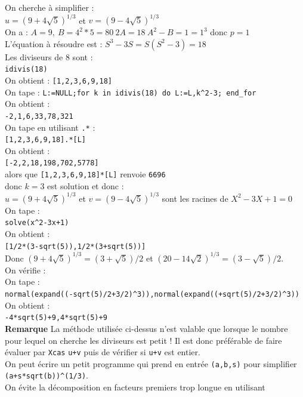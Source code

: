 \documentclass[a4paper,11pt]{book}
\begin{document}
On cherche \`a simplifier :\\
$u=(9+4\sqrt 5)^{1/3}$ et $v=(9-4\sqrt 5)^{1/3}$\\
On a : $A=9,\ B=4^2*5=80 \ 2A=18 \ A^2-B=1=1^3$ donc $p=1$\\
L'\'equation \`a r\'esoudre est : $S^3-3S=S(S^2-3)=18$\\
Les diviseurs de 8 sont :\\
{\tt idivis(18)}\\
On obtient :
{\tt [1,2,3,6,9,18]}\\
On tape :
{\tt L:=NULL;for k in  idivis(18) do L:=L,k\verb|^|2-3; end\_for}\\
On obtient :\\
{\tt -2,1,6,33,78,321}\\
On tape  en utilisant {\tt .*} :\\
{\tt [1,2,3,6,9,18].*[L]}\\
On obtient :\\
{\tt [-2,2,18,198,702,5778]}\\
alors que {\tt [1,2,3,6,9,18]*[L]} renvoie {\tt 6696}\\
donc $k=3$ est solution et donc :\\
$u=(9+4\sqrt 5)^{1/3}$ et $v=(9-4\sqrt 5)^{1/3}$ sont les racines de 
$X^2-3X+1=0$\\
On tape :\\
{\tt solve(x\verb|^|2-3x+1)}\\
On obtient :\\
{\tt [1/2*(3-sqrt(5)),1/2*(3+sqrt(5))]}\\
Donc $(9+4\sqrt 5)^{1/3}=(3+\sqrt 5)/2$ et $(20-14\sqrt 2)^{1/3}=(3-\sqrt 5)/2$.\\
On v\'erifie :\\
On tape :\\
{\tt normal(expand((-sqrt(5)/2+3/2)\verb|^|3)),normal(expand((+sqrt(5)/2+3/2)\verb|^|3))}
On obtient :\\
{\tt -4*sqrt(5)+9,4*sqrt(5)+9}\\
{\bf Remarque} La m\'ethode utilis\'ee ci-dessus n'est valable que lorsque le 
nombre pour lequel on cherche les diviseurs est petit ! Il est donc 
pr\'ef\'erable de faire \'evaluer par {\tt Xcas} {\tt u+v} puis de v\'erifier 
si {\tt u+v} est entier.\\
On peut \'ecrire un petit programme qui prend en entr\'ee {\tt (a,b,s)} pour 
simplifier  {\tt (a+s*sqrt(b))\verb|^|(1/3)}.\\
On \'evite la d\'ecomposition en facteurs premiers trop longue en utilisant 
\end{document}
